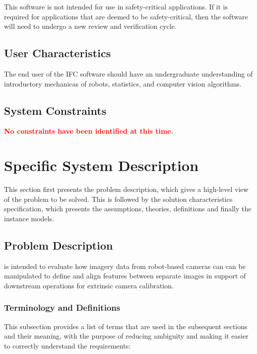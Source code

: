 \documentclass[12pt]{article}
\begin{document}
This software is not intended for use in safety-critical applications. If it is required for 
applications that are deemed to be safety-critical, then the software will need to undergo a new 
review and verification cycle.

\subsection{User Characteristics} \label{SecUserCharacteristics}
The end user of the IFC software should have an undergraduate understanding of introductory 
mechanicas of robots, statistics, and computer vision algorithms.

\subsection{System Constraints}
\textcolor{red}{\textbf{No constraints have been identified at this time.}}

\section{Specific System Description}
This section first presents the problem description, which gives a high-level
view of the problem to be solved.  This is followed by the solution characteristics
specification, which presents the assumptions, theories, definitions and finally
the instance models. 

\subsection{Problem Description} \label{Sec_pd}

\progname{} is intended to evaluate how imagery data from robot-based cameras can 
can be manipulated to define and align features between separate images in support 
of downstream operations for extrinsic camera calibration.

\subsubsection{Terminology and  Definitions}

This subsection provides a list of terms that are used in the subsequent
sections and their meaning, with the purpose of reducing ambiguity and making it
easier to correctly understand the requirements:
\end{document}
